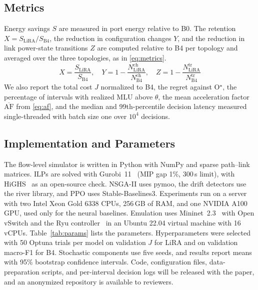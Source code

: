 \documentclass[conference]{IEEEtran}
\begin{document}
\subsection{Metrics}

Energy savings $S$ are measured in port energy relative to B0. The retention $X=S_{\mathrm{LiRA}}/S_{\mathrm{B4}}$, the reduction in configuration changes $Y$, and the reduction in link power-state transitions $Z$ are computed relative to B4 per topology and averaged over the three topologies, as in \eqref{eq:metrics}.
\begin{equation}\label{eq:metrics}
X=\frac{S_{\mathrm{LiRA}}}{S_{\mathrm{B4}}},\quad Y=1-\frac{N^{\mathrm{ch}}_{\mathrm{LiRA}}}{N^{\mathrm{ch}}_{\mathrm{B4}}},\quad Z=1-\frac{N^{\mathrm{tr}}_{\mathrm{LiRA}}}{N^{\mathrm{tr}}_{\mathrm{B4}}}
\end{equation}
We also report the total cost $J$ normalized to B4, the regret against O$^\star$, the percentage of intervals with realized MLU above $\theta$, the mean acceleration factor $\overline{\mathrm{AF}}$ from \eqref{eq:af}, and the median and 99th-percentile decision latency measured single-threaded with batch size one over $10^4$ decisions.

\subsection{Implementation and Parameters}

The flow-level simulator is written in Python with NumPy and sparse path--link matrices. ILPs are solved with Gurobi~11~\cite{gurobi} (MIP gap 1\%, 300\,s limit), with HiGHS~\cite{huangfu2018highs} as an open-source check. NSGA-II uses pymoo, the drift detectors use the river library, and PPO uses Stable-Baselines3. Experiments run on a server with two Intel Xeon Gold 6338 CPUs, 256\,GB of RAM, and one NVIDIA A100 GPU, used only for the neural baselines. Emulation uses Mininet~2.3~\cite{lantz2010mininet} with Open vSwitch and the Ryu controller~\cite{ryu} in an Ubuntu 22.04 virtual machine with 16 vCPUs. Table~\ref{tab:params} lists the parameters. Hyperparameters were selected with 50 Optuna trials per model on validation $J$ for LiRA and on validation macro-F1 for B4. Stochastic components use five seeds, and results report means with 95\% bootstrap confidence intervals. Code, configuration files, data-preparation scripts, and per-interval decision logs will be released with the paper, and an anonymized repository is available to reviewers.
\end{document}
